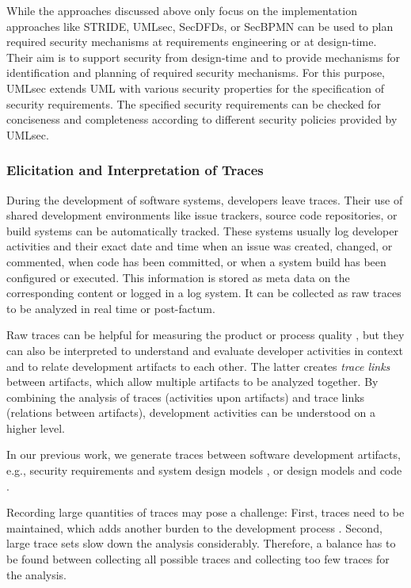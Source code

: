 While the approaches discussed above only focus on the implementation approaches like STRIDE, UMLsec, SecDFDs, or SecBPMN can be used to plan required security mechanisms at requirements engineering or at design-time. Their aim is to support security from design-time and to provide mechanisms for identification and planning of required security mechanisms. For this purpose, UMLsec extends UML with various security properties for the specification of security requirements. The specified security requirements can be checked for conciseness and completeness according to different security policies provided by UMLsec.

\vspace{-0.5em}
\subsubsection*{Elicitation and Interpretation of Traces}
\vspace{-1em}
During the development of software systems, developers leave traces. Their use of shared development environments like issue trackers, source code repositories, or build systems can be automatically tracked. These systems usually log developer activities and their exact date and time when an issue was created, changed, or commented, when code has been committed, or when a system build has been configured or executed. This information is stored as meta data on the corresponding content or logged in a log system. It can be collected as raw traces to be analyzed in real time or post-factum.

Raw traces can be helpful for measuring the product \cite{ProductMeasures} or process quality \cite{ProcessMeasures}, but they can also be interpreted to understand and evaluate developer activities  in context \cite{TraceInterpretation} and to relate development artifacts to each other. The latter creates \emph{trace links} between artifacts, which allow multiple artifacts to be analyzed together. By combining the analysis of traces (activities upon artifacts) and trace links (relations between artifacts), development activities can be understood on a higher level.

In our previous work, we generate traces between software development artifacts, e.g., security requirements and system design models \cite{Houmb2009}, or design models and code \cite{Peldszus2019}.

Recording large quantities of traces may pose a challenge: First, traces need to be maintained, which adds another burden to the development process \cite{TraceMaintenance}. Second, large trace sets slow down the analysis considerably. Therefore, a balance has to be found between collecting all possible traces and collecting too few traces for the analysis.

